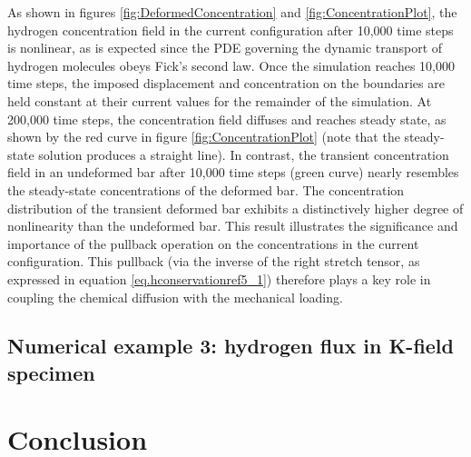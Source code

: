 \documentclass[10pt]{elsarticle}
\begin{document}
As shown in figures \ref{fig:DeformedConcentration} and \ref{fig:ConcentrationPlot}, the hydrogen concentration field in the current configuration after 10,000 time steps is nonlinear, as is expected since the PDE governing the dynamic transport of hydrogen molecules obeys Fick's second law.  Once the simulation reaches 10,000 time steps, the imposed displacement and concentration on the boundaries are held constant at their current values for the remainder of the simulation.  At 200,000 time steps, the concentration field diffuses and reaches steady state, as shown by the red curve in figure	 \ref{fig:ConcentrationPlot} (note that the steady-state solution produces a straight line).  In contrast, the transient concentration field in an undeformed bar after 10,000 time steps (green curve) nearly resembles the steady-state concentrations of the deformed bar.  The concentration distribution of the transient deformed bar exhibits a distinctively higher degree of nonlinearity than the undeformed bar.  This result illustrates the significance and importance of the pullback operation on the concentrations in the current configuration.  This pullback (via the inverse of the right stretch tensor, as expressed in equation \ref{eq.hconservationref5_1}) therefore plays a key role in coupling the chemical diffusion with the mechanical loading.
\subsection{Numerical example 3: hydrogen flux in K-field specimen}


\section{Conclusion}

%

\clearpage

%


%
\appendix
\end{document}
